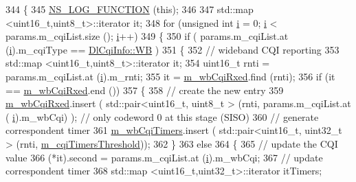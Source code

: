 \begin{DoxyCode}
344 \{
345   \hyperlink{log-macros-disabled_8h_a90b90d5bad1f39cb1b64923ea94c0761}{NS\_LOG\_FUNCTION} (\textcolor{keyword}{this});
346 
347   std::map <uint16\_t,uint8\_t>::iterator it;
348   \textcolor{keywordflow}{for} (\textcolor{keywordtype}{unsigned} \textcolor{keywordtype}{int} \hyperlink{bernuolliDistribution_8m_a6f6ccfcf58b31cb6412107d9d5281426}{i} = 0; \hyperlink{bernuolliDistribution_8m_a6f6ccfcf58b31cb6412107d9d5281426}{i} < params.m\_cqiList.size (); \hyperlink{bernuolliDistribution_8m_a6f6ccfcf58b31cb6412107d9d5281426}{i}++)
349     \{
350       \textcolor{keywordflow}{if} ( params.m\_cqiList.at (\hyperlink{bernuolliDistribution_8m_a6f6ccfcf58b31cb6412107d9d5281426}{i}).m\_cqiType == \hyperlink{structns3_1_1DlCqiInfo_a58a9fff4b49e4a8df1fdea1005c4735caa1097f844b06ac6dbdbac42802ba2403}{DlCqiInfo::WB} )
351         \{
352           \textcolor{comment}{// wideband CQI reporting}
353           std::map <uint16\_t,uint8\_t>::iterator it;
354           uint16\_t rnti = params.m\_cqiList.at (\hyperlink{bernuolliDistribution_8m_a6f6ccfcf58b31cb6412107d9d5281426}{i}).m\_rnti;
355           it = \hyperlink{classns3_1_1MmWaveFlexTtiMacScheduler_ac5f1e12f1e2a6d4e11dbc2baf7c1166a}{m\_wbCqiRxed}.find (rnti);
356           \textcolor{keywordflow}{if} (it == \hyperlink{classns3_1_1MmWaveFlexTtiMacScheduler_ac5f1e12f1e2a6d4e11dbc2baf7c1166a}{m\_wbCqiRxed}.end ())
357             \{
358               \textcolor{comment}{// create the new entry}
359               \hyperlink{classns3_1_1MmWaveFlexTtiMacScheduler_ac5f1e12f1e2a6d4e11dbc2baf7c1166a}{m\_wbCqiRxed}.insert ( std::pair<uint16\_t, uint8\_t > (rnti, params.m\_cqiList.at (
      \hyperlink{bernuolliDistribution_8m_a6f6ccfcf58b31cb6412107d9d5281426}{i}).m\_wbCqi) ); \textcolor{comment}{// only codeword 0 at this stage (SISO)}
360               \textcolor{comment}{// generate correspondent timer}
361               \hyperlink{classns3_1_1MmWaveFlexTtiMacScheduler_ac223fa16c9b7e57dd628b387833abeed}{m\_wbCqiTimers}.insert ( std::pair<uint16\_t, uint32\_t > (rnti, 
      \hyperlink{classns3_1_1MmWaveFlexTtiMacScheduler_ab79b59a03053301ed05f22fdb701a7ef}{m\_cqiTimersThreshold}));
362             \}
363           \textcolor{keywordflow}{else}
364             \{
365               \textcolor{comment}{// update the CQI value}
366               (*it).second = params.m\_cqiList.at (\hyperlink{bernuolliDistribution_8m_a6f6ccfcf58b31cb6412107d9d5281426}{i}).m\_wbCqi;
367               \textcolor{comment}{// update correspondent timer}
368               std::map <uint16\_t,uint32\_t>::iterator itTimers;

\end{DoxyCode}
